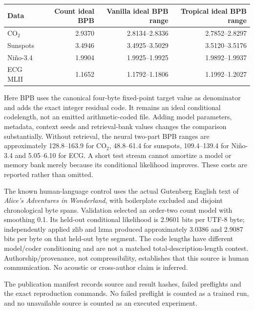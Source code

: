 \begin{center}\small
\begin{tabular}{lrrr}
\toprule
Data & Count ideal BPB & Vanilla ideal BPB range & Tropical ideal BPB range\\
\midrule
CO$_2$ &2.9370&2.8134--2.8336&2.7852--2.8297\\
Sunspots &3.4946&3.4925--3.5029&3.5120--3.5176\\
Ni\~no-3.4 &1.9904&1.9925--1.9925&1.9892--1.9937\\
ECG MLII &1.1652&1.1792--1.1806&1.1992--1.2027\\
\bottomrule
\end{tabular}
\end{center}

Here BPB uses the canonical four-byte fixed-point target value as denominator and adds the exact integer residual code. It remains an ideal conditional codelength, not an emitted arithmetic-coded file. Adding model parameters, metadata, context seeds and retrieval-bank values changes the comparison substantially. Without retrieval, the neural two-part BPB ranges are approximately 128.8--163.9 for CO$_2$, 48.8--61.4 for sunspots, 109.4--139.4 for Ni\~no-3.4 and 5.05--6.10 for ECG. A short test stream cannot amortize a model or memory bank merely because its conditional likelihood improves. These costs are reported rather than omitted.

The known human-language control uses the actual Gutenberg English text of \emph{Alice's Adventures in Wonderland}, with boilerplate excluded and disjoint chronological byte spans. Validation selected an order-two count model with smoothing 0.1. Its held-out conditional likelihood is 2.9601 bits per UTF-8 byte; independently applied zlib and lzma produced approximately 3.0386 and 2.9087 bits per byte on that held-out byte segment. The code lengths have different model/coder conditioning and are not a matched total-description-length contest. Authorship/provenance, not compressibility, establishes that this source is human communication. No acoustic or cross-author claim is inferred.

The publication manifest records source and result hashes, failed preflights and the exact reproduction commands. No failed preflight is counted as a trained run, and no unavailable source is counted as an executed experiment.
